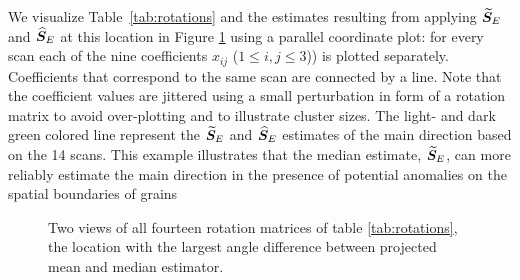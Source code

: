 We visualize Table~\ref{tab:rotations} and the estimates resulting from applying ${\widetilde{\bm S}_E}$ and ${\widehat{\bm S}_E}$ at this location in Figure \ref{fig:pcp} using a parallel coordinate plot: for every scan each of the nine coefficients $x_{ij}$ ($1 \le i,j \le 3$)) is plotted separately. Coefficients that correspond to the same scan are connected by a line.   Note that the coefficient values are jittered using a small perturbation in form of a rotation matrix to avoid over-plotting and to illustrate cluster sizes. The light- and dark green colored line represent the ${\widetilde{\bm S}_E}$ and ${\widehat{\bm S}_E}$ estimates of the main direction based on the 14 scans.   This example  illustrates that the median estimate, ${\widetilde{\bm S}_E}$,  can more reliably estimate the main direction in the presence of potential anomalies on the spatial boundaries of grains



\begin{figure}[htbp] %
   \centering
   
   \caption{ \label{fig:pcp} Two views of all fourteen rotation matrices of table \ref{tab:rotations}, the location with the largest angle difference between projected mean and median estimator.}
\end{figure}

